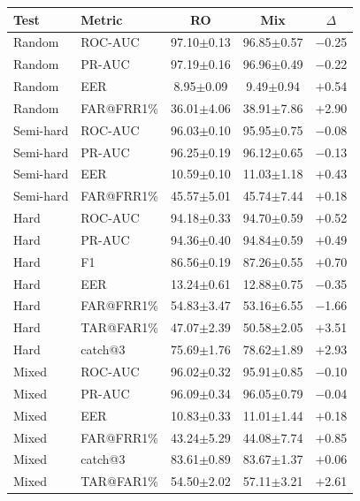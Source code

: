 \documentclass[11pt]{article}
\begin{document}
\begin{table}[!t]
\begin{minipage}[t]{0.48\textwidth}
\begin{tabular}{l l c c c}
\toprule
\textbf{Test} & \textbf{Metric} & \textbf{RO} & \textbf{Mix} & \textbf{$\Delta$} \\
\midrule
Random    & ROC-AUC    & 97.10$\pm$0.13 & 96.85$\pm$0.57 & $-$0.25 \\
Random    & PR-AUC     & 97.19$\pm$0.16 & 96.96$\pm$0.49 & $-$0.22 \\
Random    & EER        & \phantom{0}8.95$\pm$0.09 & \phantom{0}9.49$\pm$0.94 & $+$0.54 \\
Random    & FAR@FRR1\% & 36.01$\pm$4.06 & 38.91$\pm$7.86 & $+$2.90 \\
\midrule
Semi-hard & ROC-AUC    & 96.03$\pm$0.10 & 95.95$\pm$0.75 & $-$0.08 \\
Semi-hard & PR-AUC     & 96.25$\pm$0.19 & 96.12$\pm$0.65 & $-$0.13 \\
Semi-hard & EER        & 10.59$\pm$0.10 & 11.03$\pm$1.18 & $+$0.43 \\
Semi-hard & FAR@FRR1\% & 45.57$\pm$5.01 & 45.74$\pm$7.44 & $+$0.18 \\
\midrule
Hard      & ROC-AUC    & 94.18$\pm$0.33 & 94.70$\pm$0.59 & $+$0.52 \\
Hard      & PR-AUC     & 94.36$\pm$0.40 & 94.84$\pm$0.59 & $+$0.49 \\
Hard      & F1         & 86.56$\pm$0.19 & 87.26$\pm$0.55 & $+$0.70 \\
Hard      & EER        & 13.24$\pm$0.61 & 12.88$\pm$0.75 & $-$0.35 \\
Hard      & FAR@FRR1\% & 54.83$\pm$3.47 & 53.16$\pm$6.55 & $-$1.66 \\
Hard      & TAR@FAR1\% & 47.07$\pm$2.39 & 50.58$\pm$2.05 & $+$3.51 \\
Hard      & catch@3    & 75.69$\pm$1.76 & 78.62$\pm$1.89 & $+$2.93 \\
\midrule
Mixed     & ROC-AUC    & 96.02$\pm$0.32 & 95.91$\pm$0.85 & $-$0.10 \\
Mixed     & PR-AUC     & 96.09$\pm$0.34 & 96.05$\pm$0.79 & $-$0.04 \\
Mixed     & EER        & 10.83$\pm$0.33 & 11.01$\pm$1.44 & $+$0.18 \\
Mixed     & FAR@FRR1\% & 43.24$\pm$5.29 & 44.08$\pm$7.74 & $+$0.85 \\
Mixed     & catch@3    & 83.61$\pm$0.89 & 83.67$\pm$1.37 & $+$0.06 \\
Mixed     & TAR@FAR1\% & 54.50$\pm$2.02 & 57.11$\pm$3.21 & $+$2.61 \\
\bottomrule
\end{tabular}
\label{tab:app_pan_electra}
\end{minipage}
\end{table}
\end{document}
